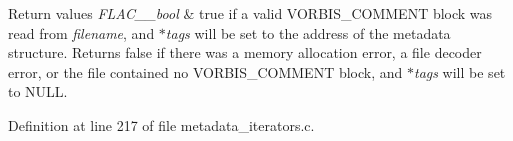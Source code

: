 \begin{DoxyRetVals}{Return values}
{\em F\+L\+A\+C\+\_\+\+\_\+bool} & {\ttfamily true} if a valid V\+O\+R\+B\+I\+S\+\_\+\+C\+O\+M\+M\+E\+NT block was read from {\itshape filename}, and {\itshape $\ast$tags} will be set to the address of the metadata structure. Returns {\ttfamily false} if there was a memory allocation error, a file decoder error, or the file contained no V\+O\+R\+B\+I\+S\+\_\+\+C\+O\+M\+M\+E\+NT block, and {\itshape $\ast$tags} will be set to {\ttfamily N\+U\+LL}. \\
\hline
\end{DoxyRetVals}


Definition at line 217 of file metadata\+\_\+iterators.\+c.


